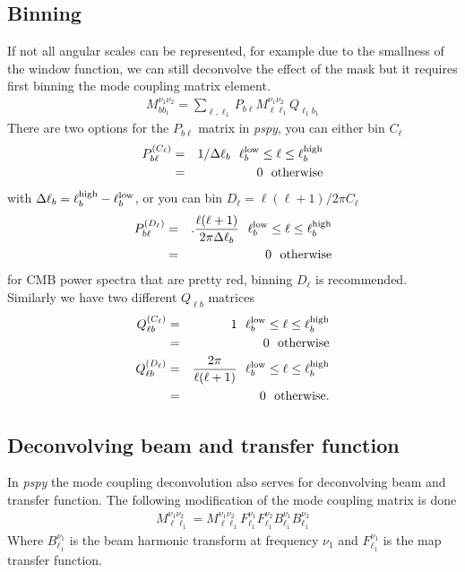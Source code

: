 \documentclass[a4paper, 11pt]{article}
\def\ba{\begin{eqnarray}}
\def\ea{\end{eqnarray}}
\begin{document}
\subsection{Binning}

If not all angular scales can be represented,  for example  due to the smallness of the window function, we can still deconvolve the effect of the mask but it requires first binning the mode coupling matrix element.
\ba
M^{\nu_{1}\nu_{2}}_{b b_{1}}= \sum_{\ell, \ell_{1}} P_{b \ell} M^{\nu_{1}\nu_{2} }_{\ell \ell_{1}}  Q_{\ell_{1} b_{1}}
\ea
There are two options for the $P_{b \ell}$ matrix in {\it pspy}, you can either bin $C_{\ell}$ 
\ba
P^{(C_{\ell})}_{b \ell} &=& 1/\Delta \ell_{b} \ \ \ell^{\rm low}_{b} \le \ell \le \ell^{\rm high}_{b} \nonumber \\
&=& 0 \ \ {\rm otherwise}
\ea
with $\Delta \ell_{b} =  \ell^{\rm high}_{b}- \ell^{\rm low}_{b}$, or you can bin  $D_{\ell}= \ell (\ell+1) / 2\pi C_{\ell}$ 
\ba
P^{(D_{\ell})}_{b \ell} &=&.  \frac{\ell (\ell+1) }{ 2\pi \Delta \ell_{b}} \ \ \ell^{\rm low}_{b} \le \ell \le \ell^{\rm high}_{b} \nonumber \\
&=& 0 \ \ {\rm otherwise}
\ea
for CMB power spectra that are pretty red, binning $D_{\ell}$ is recommended. Similarly we have two different $ Q_{\ell b}$ matrices
\ba
Q^{(C_{\ell})}_{\ell b} &=& 1   \ \ \ell^{\rm low}_{b} \le \ell \le \ell^{\rm high}_{b}  \nonumber \\
&=& 0 \ \ {\rm otherwise} \nonumber \\
Q^{(D_{\ell})}_{\ell b} &=& \frac{2\pi}{\ell (\ell+1)}  \ \ \ell^{\rm low}_{b} \le \ell \le \ell^{\rm high}_{b} \nonumber \\
&=& 0 \ \ {\rm otherwise} \nonumber .\\
\ea

\subsection{Deconvolving beam and transfer function}

In {\it pspy} the mode coupling deconvolution also serves for deconvolving beam and transfer function.
The following modification of the mode coupling matrix is done
\ba
M^{\nu_{1}\nu_{2} }_{\ell \ell_{1}}= M^{\nu_{1}\nu_{2} }_{\ell \ell_{1}} F^{\nu_{1}}_{\ell_{1}}F^{\nu_{2}}_{\ell_{1}}  B^{\nu_{1}}_{\ell_{1}}   B^{\nu_{2}}_{\ell_{1}} 
\ea
Where $ B^{\nu_{1}}_{\ell_{1}}$ is the beam harmonic transform at frequency $\nu_{1}$  and $ F^{\nu_{1}}_{\ell_{1}}$ is the map transfer function.
\end{document}
